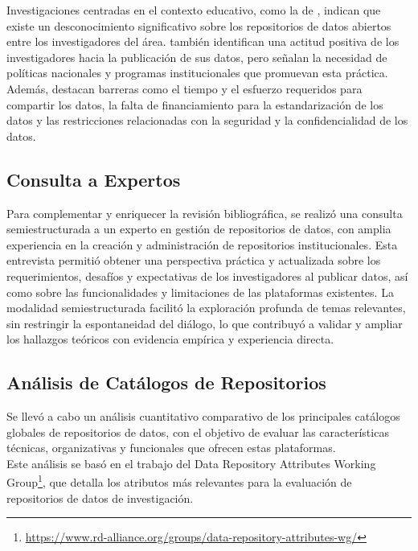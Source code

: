\documentclass[runningheads]{llncs}
\begin{document}
Investigaciones centradas en el contexto educativo, como la de \cite{casali2022}, indican que existe un desconocimiento significativo sobre los repositorios de datos abiertos entre los investigadores del área. \cite{casali2022} también identifican una actitud positiva de los investigadores hacia la publicación de sus datos, pero señalan la necesidad de políticas nacionales y programas institucionales que promuevan esta práctica. Además, destacan barreras como el tiempo y el esfuerzo requeridos para compartir los datos, la falta de financiamiento para la estandarización de los datos y las restricciones relacionadas con la seguridad y la confidencialidad de los datos.\\

\subsection{Consulta a Expertos}

Para complementar y enriquecer la revisión bibliográfica, se realizó una consulta semiestructurada a un experto en gestión de repositorios de datos, con amplia experiencia en la creación y administración de repositorios institucionales. Esta entrevista permitió obtener una perspectiva práctica y actualizada sobre los requerimientos, desafíos y expectativas de los investigadores al publicar datos, así como sobre las funcionalidades y limitaciones de las plataformas existentes.
La modalidad semiestructurada facilitó la exploración profunda de temas relevantes, sin restringir la espontaneidad del diálogo, lo que contribuyó a validar y ampliar los hallazgos teóricos con evidencia empírica y experiencia directa.\\

\subsection{Análisis de Catálogos de Repositorios}

Se llevó a cabo un análisis cuantitativo comparativo de los principales catálogos globales de repositorios de datos, con el objetivo de evaluar las características técnicas, organizativas y funcionales que ofrecen estas plataformas.\\

Este análisis se basó en el trabajo del Data Repository Attributes Working Group\footnote{\url{https://www.rd-alliance.org/groups/data-repository-attributes-wg/}}, que detalla los atributos más relevantes para la evaluación de repositorios de datos de investigación.\\
\end{document}
